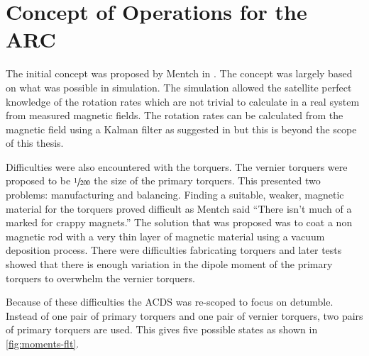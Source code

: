 \section{Concept of Operations for the \acl*{ARC}}

The initial concept was proposed by Mentch in \cite{Mentch11}. The concept was largely based on what was possible in simulation. The simulation allowed the satellite perfect knowledge of the rotation rates which are not trivial to calculate in a real system from measured magnetic fields. The rotation rates can be calculated from the magnetic field using a Kalman filter as suggested in \cite{Sturm05} but this is beyond the scope of this thesis.

Difficulties were also encountered with the torquers. The vernier torquers were proposed to be $\sfrac{1}{200}$ the size of the primary torquers. This presented two problems: manufacturing and balancing. Finding a suitable, weaker, magnetic material for the torquers proved difficult as Mentch said \enquote{There isn't much of a marked for crappy magnets.} The solution that was proposed was to coat a non magnetic rod with a very thin layer of magnetic material using a vacuum deposition process. There were difficulties fabricating torquers and later tests showed that there is enough variation in the dipole moment of the primary torquers to overwhelm the vernier torquers. 

Because of these difficulties the \ac{ACDS} was re-scoped to focus on detumble. Instead of one pair of primary torquers and one pair of vernier torquers, two pairs of primary torquers are used. This gives five possible states as shown in \cref{fig:moments-flt}.

